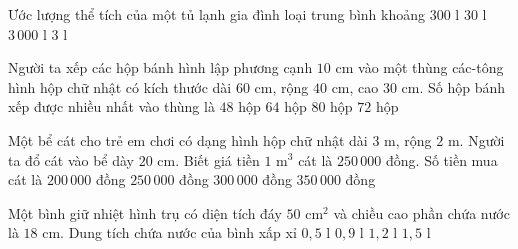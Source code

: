 \begin{ex} %
Ước lượng thể tích của một tủ lạnh gia đình loại trung bình khoảng
\choice
{\True $300\text{ l}$}
{$30\text{ l}$}
{$3\,000\text{ l}$}
{$3\text{ l}$}
\end{ex}

\begin{ex} %
Người ta xếp các hộp bánh hình lập phương cạnh $10\text{ cm}$ vào một thùng các-tông hình hộp chữ nhật có kích thước dài $60\text{ cm}$, rộng $40\text{ cm}$, cao $30\text{ cm}$. Số hộp bánh xếp được nhiều nhất vào thùng là
\choice
{$48$ hộp}
{$64$ hộp}
{$80$ hộp}
{\True $72$ hộp}
\end{ex}

\begin{ex} %
Một bể cát cho trẻ em chơi có dạng hình hộp chữ nhật dài $3\text{ m}$, rộng $2\text{ m}$. Người ta đổ cát vào bể dày $20\text{ cm}$. Biết giá tiền $1\text{ m}^3$ cát là $250\,000$ đồng. Số tiền mua cát là
\choice
{$200\,000$ đồng}
{$250\,000$ đồng}
{\True $300\,000$ đồng}
{$350\,000$ đồng}
\end{ex}

\begin{ex} %
Một bình giữ nhiệt hình trụ có diện tích đáy $50\text{ cm}^2$ và chiều cao phần chứa nước là $18\text{ cm}$. Dung tích chứa nước của bình xấp xỉ
\choice
{$0{,}5\text{ l}$}
{\True $0{,}9\text{ l}$}
{$1{,}2\text{ l}$}
{$1{,}5\text{ l}$}
\end{ex}

